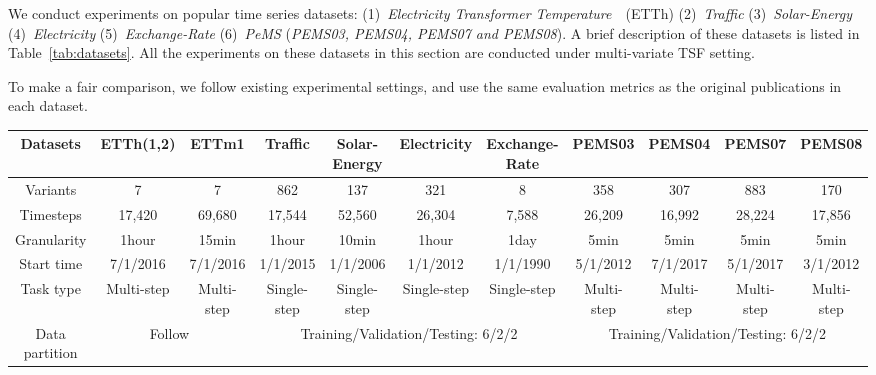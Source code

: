\documentclass{article}
\begin{document}
We conduct experiments on  popular time series datasets: (1)~\emph{Electricity Transformer Temperature}~\citep{Zhou2020InformerBE}~(ETTh) 
(2)~\emph{Traffic}
(3)~\emph{Solar-Energy}
(4)~\emph{Electricity}
(5)~\emph{Exchange-Rate}
(6)~\textit{PeMS} (\emph{PEMS03, PEMS04, PEMS07 and PEMS08}). 
A brief description of these datasets is listed in Table~\ref{tab:datasets}. All the experiments on these datasets in this section are conducted under multi-variate TSF setting. 

To make a fair comparison, we follow existing experimental settings, and use the same evaluation metrics as the original publications \citep{Hyndman2006AnotherLA, Makridakis1982TheAO, xu2021autoformer, Lai2018ModelingLA} in each dataset. 

\begin{table*}[t]
\caption{The overall information of the  datasets.}
\begin{center}
\scriptsize
\resizebox{\textwidth}{!}
{
\begin{tabular}{c|cc|cccc|cccc}
\hline
Datasets       & ETTh(1,2)     & ETTm1          & Traffic     & Solar-Energy & Electricity & Exchange-Rate & PEMS03       & PEMS04      & PEMS07      & PEMS08      \\ \hline
Variants       & 7             & 7              & 862         & 137          & 321         & 8             & 358          & 307         & 883         & 170         \\
Timesteps      & 17,420        & 69,680         & 17,544      & 52,560       & 26,304      & 7,588         & 26,209       & 16,992      & 28,224      & 17,856      \\
Granularity    & 1hour         & 15min          & 1hour       & 10min        & 1hour       & 1day          & 5min         & 5min        & 5min        & 5min        \\
Start time     & 7/1/2016      & 7/1/2016       & 1/1/2015       & 1/1/2006    & 1/1/2012     & 1/1/1990    & 5/1/2012      & 7/1/2017     & 5/1/2017    & 3/1/2012    \\
Task type      & Multi-step    & Multi-step     & Single-step & Single-step  & Single-step & Single-step   & Multi-step   & Multi-step  & Multi-step  & Multi-step  \\ \hline
Data partition & \multicolumn{2}{c|}{Follow~\citep{Zhou2020InformerBE}}          & \multicolumn{4}{c|}{Training/Validation/Testing: 6/2/2}  & \multicolumn{4}{c}{Training/Validation/Testing: 6/2/2} \\ \hline
\end{tabular}}
\end{center}

\label{tab:datasets}
\end{table*}
\end{document}
